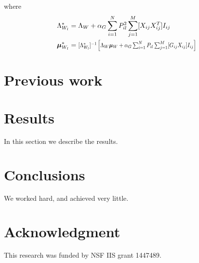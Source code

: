 \documentclass[10pt]{proc}
\begin{document}
%
where
%
\begin{align}
    \Lambda_{W_l}^* &= \begin{aligned}[t]
        \Lambda_W + \alpha_G \sum_{i=1}^N P_{il}^2 \sum_{j=1}^M
            [X_{ij} X_{ij}^T] I_{ij}
    \end{aligned}\\
%
    \bm{\mu}_{W_l}^* &= \begin{aligned}[t]
        \vstretch{0.9}{\hstretch{0.8}{
            [\Lambda_{W_l}^*]^{-1} \left[
                \Lambda_W\bm{\mu}_W +
                \alpha_G \sum_{i=1}^N P_{il} \sum_{j=1}^M
                    [G_{ij} X_{ij}] I_{ij}
            \right]}}
    \end{aligned}
\end{align}


\section{Previous work}\label{previous work}


\section{Results}\label{results}
In this section we describe the results.


\section{Conclusions}\label{conclusions}
We worked hard, and achieved very little.


\section*{Acknowledgment}
This research was funded by NSF IIS grant 1447489.




\end{document}
